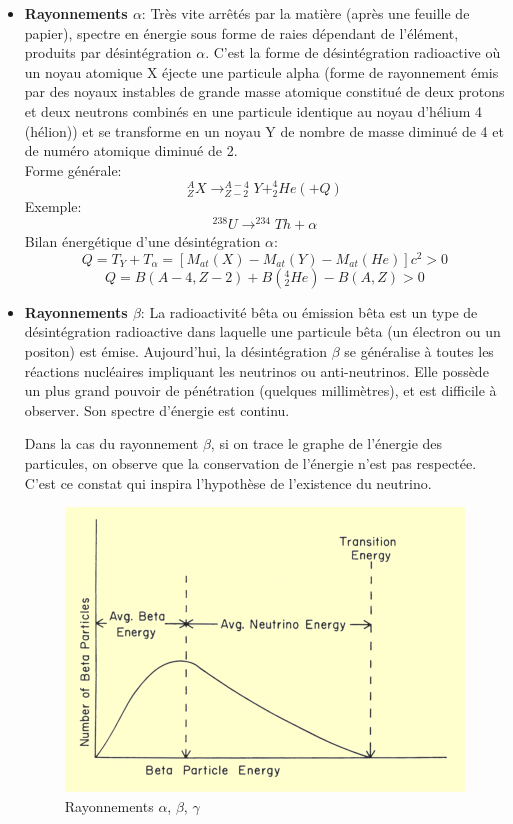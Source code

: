     \begin{itemize}
        \item \textbf{Rayonnements $\alpha$}: Très vite arrêtés par la matière (après une feuille de papier), spectre en énergie sous forme de raies dépendant de l'élément, produits par désintégration $\alpha$. C'est la forme de désintégration radioactive où un noyau atomique X éjecte une particule alpha (forme de rayonnement émis par des noyaux instables de grande masse atomique constitué de deux protons et deux neutrons combinés en une particule identique au noyau d'hélium 4 (hélion)) et se transforme en un noyau Y  de nombre de masse diminué de 4 et de numéro atomique diminué de 2. \\
        Forme générale:
            \[
                ^{A}_{Z}X \rightarrow ^{A-4}_{Z-2}Y + ^{4}_{2}He(+Q)
            \] 
        Exemple: 
            \[
                ^{238}_{}U \rightarrow ^{234}_{}Th + \alpha
            \]
        Bilan énergétique d'une désintégration $\alpha$:
            \[
                Q = T_Y + T_\alpha = [M_{at}(X)-M_{at}(Y)-M_{at}(He)]c^2>0 
            \]
            \[
        Q=B(A-4,Z-2)+B(^{4}_{2}He)-B(A,Z)>0
            \]
        
        \item \textbf{Rayonnements $\beta$}: La radioactivité bêta ou émission bêta est un type de désintégration radioactive dans laquelle une particule bêta (un électron ou un positon) est émise. Aujourd'hui, la désintégration $\beta$ se généralise à toutes les réactions nucléaires impliquant les neutrinos ou anti-neutrinos. Elle possède un plus grand pouvoir de pénétration (quelques millimètres), et est difficile à observer. Son spectre d'énergie est continu. 
 
       Dans la cas du rayonnement $\beta$, si on trace le graphe de l'énergie des particules, on observe que la conservation de l'énergie n'est pas respectée. C'est ce constat qui inspira l'hypothèse de l'existence du neutrino. 

        \begin{figure}[ht]
         \centering
        \includegraphics[scale=0.25]{Images1/beta.png}
        \caption{Rayonnements $\alpha$, $\beta$, $\gamma$}
        \end{figure}
        

\end{itemize}
